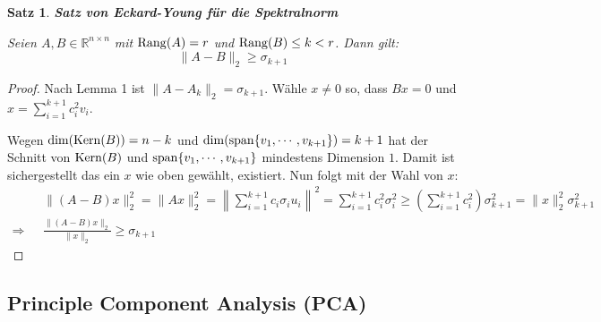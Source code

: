 \documentclass{article}
\newcommand{\R}[0]{\mathbb{R}}
\newtheorem{thm}{Satz}
\begin{document}
\begin{thm} \textbf{Satz von Eckard-Young für die Spektralnorm}

    Seien $A, B \in \R^{n \times n}$ mit ${\rm Rang}(A) = r$ und ${\rm Rang}(B) \leq k < r$. Dann gilt:
    \begin{equation}
        \lVert A - B \rVert_2 \geq \sigma_{k+1}
    \end{equation}
\end{thm}

\begin{proof}
    Nach Lemma 1 ist $\lVert A - A_k \rVert_2 = \sigma_{k+1}$. Wähle $x \neq 0$ so, dass $Bx = 0$ und $x = \sum\limits_{i=1}^{k+1} c_i^2v_i$.

    Wegen ${\rm dim}({\rm Kern}(B)) = n - k$ und ${\rm dim}({\rm span}\{v_1, \cdots, v_{k+1}\}) = k + 1$ hat der Schnitt von ${\rm Kern}(B)$ und ${\rm span}\{v_1, \cdots, v_{k+1}\}$ mindestens Dimension $1$. 
    Damit ist sichergestellt das ein $x$ wie oben gewählt, existiert. Nun folgt mit der Wahl von $x$:
    \begin{align*}
        &\lVert(A-B)x\rVert_2^2 = \lVert Ax \rVert^2_2 = \left\lVert \sum\limits_{i=1}^{k+1} c_i\sigma_i u_i \right\rVert^2 = \sum\limits_{i=1}^{k+1}c_i^2\sigma_i^2 \geq \left(\sum\limits_{i=1}^{k+1}c_i^2\right)\sigma_{k+1}^2 = \lVert x \rVert_2^2 \sigma_{k+1}^2 \\
    \Rightarrow \:\:\: &\frac{\lVert (A - B)x \rVert_2}{\lVert x \rVert_2} \geq \sigma_{k+1}
    \end{align*}
\end{proof}

\subsection{Principle Component Analysis (PCA)}
\end{document}
